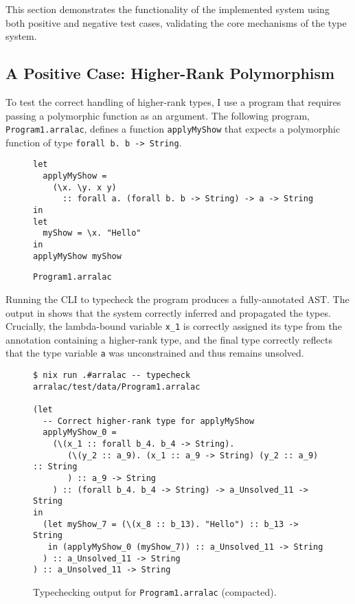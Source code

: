 This section demonstrates the functionality of the implemented system using both positive and negative test cases, validating the core mechanisms of the type system.

\subsection{A Positive Case: Higher-Rank Polymorphism}
To test the correct handling of higher-rank types, I use a program that requires passing a polymorphic function as an argument. The following program, \texttt{Program1.arralac}, defines a function \texttt{applyMyShow} that expects a polymorphic function of type \texttt{forall b. b -> String}.

\begin{figure}
    \centering
    \begin{verbatim}
let
  applyMyShow =
    (\x. \y. x y)
      :: forall a. (forall b. b -> String) -> a -> String
in
let
  myShow = \x. "Hello"
in
applyMyShow myShow
\end{verbatim}
    \caption{\texttt{Program1.arralac}}
\end{figure}

Running the \Arralac CLI to typecheck the program produces a fully-annotated AST. The output in  shows that the system correctly inferred and propagated the types. Crucially, the lambda-bound variable \texttt{x\_1} is correctly assigned its type from the annotation containing a higher-rank type, and the final type correctly reflects that the type variable \texttt{a} was unconstrained and thus remains unsolved.

\begin{figure}[h]
    \centering
    \begin{verbatim}
$ nix run .#arralac -- typecheck arralac/test/data/Program1.arralac

(let
  -- Correct higher-rank type for applyMyShow
  applyMyShow_0 = 
    (\(x_1 :: forall b_4. b_4 -> String).
       (\(y_2 :: a_9). (x_1 :: a_9 -> String) (y_2 :: a_9) :: String
       ) :: a_9 -> String
    ) :: (forall b_4. b_4 -> String) -> a_Unsolved_11 -> String
in
  (let myShow_7 = (\(x_8 :: b_13). "Hello") :: b_13 -> String
   in (applyMyShow_0 (myShow_7)) :: a_Unsolved_11 -> String
  ) :: a_Unsolved_11 -> String
) :: a_Unsolved_11 -> String
\end{verbatim}
    \caption{Typechecking output for \texttt{Program1.arralac} (compacted).}
    \label{fig:typecheck-output}
\end{figure}

